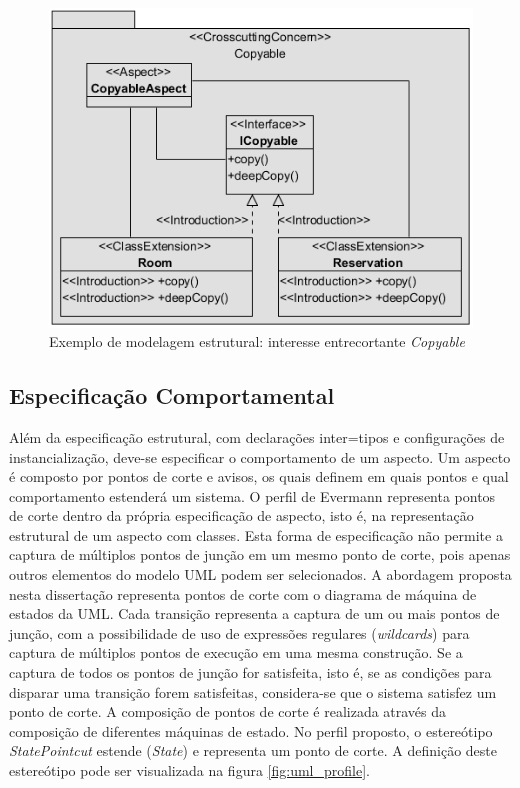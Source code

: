 \begin{figure}[!h] \centering
	\includegraphics{img/structural_profile_example.png}
	\caption{Exemplo de modelagem estrutural: interesse entrecortante \textit{Copyable}}\label{fig:structural_profile_example}
\end{figure}

\subsection{Especificação Comportamental}

Além da especificação estrutural, com declarações inter=tipos e configurações de instancialização, deve-se especificar o comportamento de um aspecto.
Um aspecto é composto por pontos de corte e avisos, os quais definem em quais pontos e qual comportamento estenderá um sistema. O perfil de Evermann 
\cite{Evermann:2007:MSP:1229375.1229379} representa pontos de corte dentro da própria especificação de aspecto, isto é, na representação estrutural de
um aspecto com classes. Esta forma de especificação não permite a captura de múltiplos pontos de junção em um mesmo ponto de corte, pois
apenas outros elementos do modelo UML podem ser selecionados. A abordagem proposta nesta dissertação representa pontos de corte com o diagrama de máquina 
de estados da UML. Cada transição representa a captura de um ou mais pontos de junção, com a possibilidade de uso de expressões regulares
(\textit{wildcards}) para captura de múltiplos pontos de execução em uma mesma construção. Se a captura de todos os pontos de junção for 
satisfeita, isto é, se as condições para disparar uma transição forem satisfeitas, considera-se que o sistema satisfez um ponto de corte. A composição
de pontos de corte é realizada através da composição de diferentes máquinas de estado. No perfil proposto, o estereótipo \textit{StatePointcut} 
estende (\textit{State}) e representa um ponto de corte. A definição deste estereótipo pode ser visualizada na figura \ref{fig:uml_profile}.

